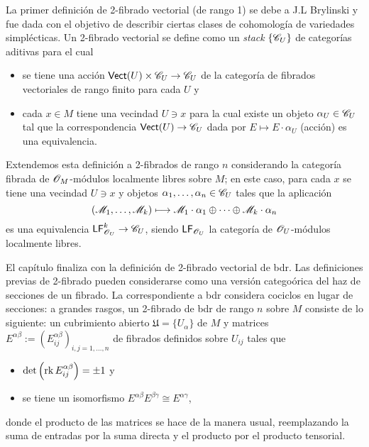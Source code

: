 {La primer definici\'on de 2-fibrado vectorial (de rango 1) se debe a J.L Brylinski y fue dada con el objetivo de describir ciertas clases de cohomolog\'ia de variedades simpl\'ecticas. Un 2-fibrado vectorial se define como un \emph{stack} $\{\mathscr{C}_U\}$ de categor\'ias aditivas para el cual
\begin{itemize}
\item se tiene una acci\'on $\mathsf{Vect}(U)\times \mathscr{C}_U\to \mathscr{C}_U$ de la categor\'ia de fibrados vectoriales de rango finito para cada $U$ y
\item cada $x\in M$ tiene una vecindad $U\ni x$ para la cual existe un objeto $\alpha_U\in \mathscr{C}_U$ tal que la correspondencia $\mathsf{Vect}(U)\to \mathscr{C}_U$ dada por $E\mapsto E\cdot \alpha_U$ (acci\'on) es una equivalencia.
\end{itemize}
Extendemos esta definici\'on a 2-fibrados de rango $n$ considerando la categor\'ia fibrada de $\mathscr{O}_M$-m\'odulos localmente libres sobre $M$; en este caso, para cada $x$ se tiene una vecindad $U\ni x$ y objetos $\alpha_1,\dots ,\alpha_n\in \mathscr{C}_U$ tales que la aplicaci\'on
$$(\mathscr{M}_1,\dots ,\mathscr{M}_k)\longmapsto \mathscr{M}_1\cdot \alpha_1\oplus \cdots \oplus \mathscr{M}_k\cdot \alpha_n$$
es una equivalencia $\mathsf{LF}_{\mathscr{O}_U}^k\to \mathscr{C}_U$, siendo $\mathsf{LF}_{\mathscr{O}_U}$ la categor\'ia de $\mathscr{O}_U$-m\'odulos localmente libres.

El cap\'itulo finaliza con la definici\'on de 2-fibrado vectorial de {\sc bdr}. Las definiciones previas de 2-fibrado pueden considerarse como una versi\'on catego\'orica del haz de secciones de un fibrado. La correspondiente a {\sc bdr} considera cociclos en lugar de secciones: a grandes rasgos, un 2-fibrado de {\sc bdr} de rango $n$ sobre $M$ consiste de lo siguiente: un cubrimiento abierto $\mathfrak{U}=\{U_\alpha \}$ de $M$ y matrices $E^{\alpha \beta}:=(E^{\alpha \beta}_{ij})_{i,j=1,\dots ,n}$ de fibrados definidos sobre $U_{ij}$ tales que
\begin{itemize}
\item $\det \left (\operatorname{rk}E^{\alpha \beta}_{ij}\right )=\pm 1$ y
\item se tiene un isomorfismo $E^{\alpha \beta}E^{\beta \gamma}\cong E^{\alpha \gamma}$,
\end{itemize}
donde el producto de las matrices se hace de la manera usual, reemplazando la suma de entradas por la suma directa y el producto por el producto tensorial.

}
